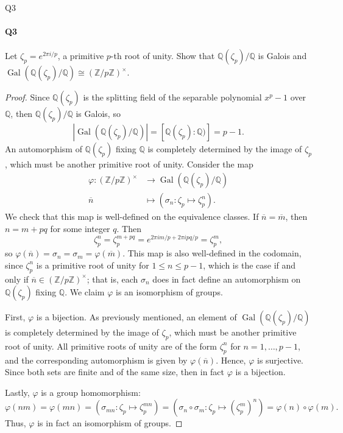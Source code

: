 \documentclass[12pt]{article}
\newenvironment{fullbox}{\begin{lrbox}{\savefullbox}\begin{minipage}{\dimexpr\textwidth-2\fboxsep\relax}}{\end{minipage}\end{lrbox}\begin{center}\framebox[\textwidth]{\usebox{\savefullbox}}\end{center}}
\newenvironment{pbox}[1][]{\begin{fullbox}\ifx#1\empty\else\paragraph{#1}\fi}{\end{fullbox}}
\newcommand{\Z}{\mathbb{Z}}
\newcommand{\Q}{\mathbb{Q}}
\renewcommand{\phi}{\varphi}
\newcommand{\<}{\langle}
\renewcommand{\>}{\rangle}
\newcommand{\isom}{\cong}
\newcommand{\eqc}{\overline}
\DeclareMathOperator{\Gal}{Gal}
\begin{document}
\newpage
\begin{pbox}[Q3]
    Let $\zeta_p = e^{2\pi i /p}$, a primitive $p$-th root of unity. Show that $\Q(\zeta_p)/\Q$ is Galois and $\Gal(\Q(\zeta_p)/\Q) \isom (\Z/p\Z)^\times$.
\end{pbox}

\begin{proof}
    Since $\Q(\zeta_p)$ is the splitting field of the separable polynomial $x^p - 1$ over $\Q$, then $\Q(\zeta_p)/\Q$ is Galois, so
    \[
        |\Gal(\Q(\zeta_p)/\Q)| = [\Q(\zeta_p) : \Q)] = p - 1.
    \]
    An automorphism of $\Q(\zeta_p)$ fixing $\Q$ is completely determined by the image of $\zeta_p$, which must be another primitive root of unity. Consider the map
    \begin{align*}
        \phi :  (\Z/p\Z)^\times &\to \Gal(\Q(\zeta_p)/\Q) \\
            \eqc{n} &\mapsto (\sigma_n : \zeta_p \mapsto \zeta_p^n).
    \end{align*}
    We check that this map is well-defined on the equivalence classes. If $\eqc{n} = \eqc{m}$, then $n = m + pq$ for some integer $q$. Then
    \[
        \zeta_p^n = \zeta_p^{m + pq} = e^{2\pi i m/p + 2\pi i pq/p} = \zeta_p^m,
    \]
    so $\phi(\eqc{n}) = \sigma_n = \sigma_m = \phi(\eqc{m})$. This map is also well-defined in the codomain, since $\zeta_p^n$ is a primitive root of unity for $1 \leq n \leq p - 1$, which is the case if and only if $\eqc{n} \in (\Z/p\Z)^\times$; that is, each $\sigma_n$ does in fact define an automorphism on $\Q(\zeta_p)$ fixing $\Q$. We claim $\phi$ is an isomorphism of groups.

    First, $\phi$ is a bijection. As previously mentioned, an element of $\Gal(\Q(\zeta_p)/\Q)$ is completely determined by the image of $\zeta_p$, which must be another primitive root of unity. All primitive roots of unity are of the form $\zeta_p^n$ for $n = 1, \dots, p - 1$, and the corresponding automorphism is given by $\phi(\eqc{n})$. Hence, $\phi$ is surjective. Since both sets are finite and of the same size, then in fact $\phi$ is a bijection.

    Lastly, $\phi$ is a group homomorphism:
    \[
        \phi(nm)
            = \phi(mn)
            = \left(\sigma_{mn} : \zeta_p \mapsto \zeta_p^{mn}\right) 
            = \left(\sigma_n \circ \sigma_m : \zeta_p \mapsto (\zeta_p^m)^n\right) 
            = \phi(n) \circ \phi(m).
    \]
    Thus, $\phi$ is in fact an isomorphism of groups.

\end{proof}
\end{document}
